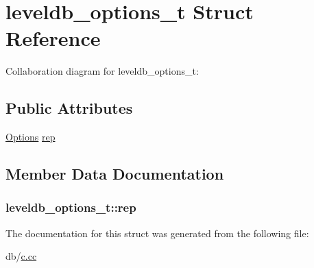 \hypertarget{structleveldb__options__t}{\section{leveldb\-\_\-options\-\_\-t Struct Reference}
\label{structleveldb__options__t}
}


Collaboration diagram for leveldb\-\_\-options\-\_\-t\-:
\subsection*{Public Attributes}
\begin{DoxyCompactItemize}
\item 
\hyperlink{structleveldb_1_1_options}{Options} \hyperlink{structleveldb__options__t_a4f9a6dde987957ab489bf26c9d191df9}{rep}
\end{DoxyCompactItemize}


\subsection{Member Data Documentation}
\hypertarget{structleveldb__options__t_a4f9a6dde987957ab489bf26c9d191df9}{
\subsubsection[{rep}]{ leveldb\-\_\-options\-\_\-t\-::rep}}\label{structleveldb__options__t_a4f9a6dde987957ab489bf26c9d191df9}


The documentation for this struct was generated from the following file\-:\begin{DoxyCompactItemize}
\item 
db/\hyperlink{c_8cc}{c.\-cc}\end{DoxyCompactItemize}
